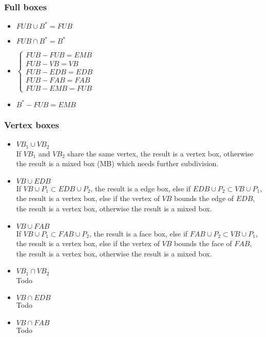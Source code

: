 \documentclass[twoside]{article}
\begin{document}
\begin{multicols}{2}
\subsubsection{Full boxes}
\begin{itemize}
\item $FUB \cup B^* = FUB$
\item $FUB \cap B^* = B^*$
\item $\left\{
\begin{array}{l}
FUB - FUB = EMB\\
FUB - VB = VB\\
FUB - EDB = EDB\\
FUB - FAB = FAB\\
FUB - EMB = FUB
\end{array}
\right.$
\item $B^* - FUB = EMB$
\end{itemize}

\subsubsection{Vertex boxes}
\begin{itemize}
\item $VB_1 \cup VB_2$
\\
If $VB_1$ and $VB_2$ share the same vertex, the result is a vertex box, otherwise the result is a mixed box (MB) which needs further subdivision.

\item $VB \cup EDB$
\\
If $VB \cup P_1 \subset EDB \cup P_2$, the result is a edge box, else if $EDB \cup P_2 \subset VB \cup P_1$, the result is a vertex box, else if the vertex of $VB$ bounds the edge of $EDB$, the result is a vertex box, otherwise the result is a mixed box.

\item $VB \cup FAB$
\\
If $VB \cup P_1 \subset FAB \cup P_2$, the result is a face box, else if $FAB \cup P_2 \subset VB \cup P_1$, the result is a vertex box, else if the vertex of $VB$ bounds the face of $FAB$, the result is a vertex box, otherwise the result is a mixed box.

\item $VB_1 \cap VB_2$
\\
Todo

\item $VB \cap EDB$
\\
Todo

\item $VB \cap FAB$
\\
Todo


\end{itemize}
\end{multicols}
\end{document}
